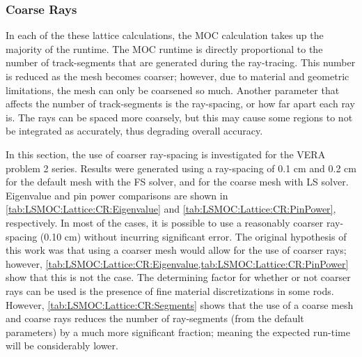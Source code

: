 {{{      \subsubsection{Coarse Rays}{\label{sssec:LSMOC:Coarse Rays}
        In each of the these lattice calculations, the \ac{MOC} calculation takes up the majority of the runtime.
        The \ac{MOC} runtime is directly proportional to the number of track-segments that are generated during the ray-tracing.
        This number is reduced as the mesh becomes coarser; however, due to material and geometric limitations, the mesh can only be coarsened so much.
        Another parameter that affects the number of track-segments is the ray-spacing, or how far apart each ray is.
        The rays can be spaced more coarsely, but this may cause some regions to not be integrated as accurately, thus degrading overall accuracy.

        In this section, the use of coarser ray-spacing is investigated for the \ac{VERA} problem 2 series.
        Results were generated using a ray-spacing of 0.1 cm and 0.2 cm for the default mesh with the \ac{FS} solver, and for the coarse mesh with \ac{LS} solver.
        Eigenvalue and pin power comparisons are shown in \cref{tab:LSMOC:Lattice:CR:Eigenvalue} and \cref{tab:LSMOC:Lattice:CR:PinPower}, respectively.
        In most of the cases, it is possible to use a reasonably coarser ray-spacing (0.10 cm) without incurring significant error.
        The original hypothesis of this work was that using a coarser mesh would allow for the use of coarser rays; however, \cref{tab:LSMOC:Lattice:CR:Eigenvalue,tab:LSMOC:Lattice:CR:PinPower} show that this is not the case.
        The determining factor for whether or not coarser rays can be used is the presence of fine material discretizations in some rods.
        However, \cref{tab:LSMOC:Lattice:CR:Segments} shows that the use of a coarse mesh and coarse rays reduces the number of ray-segments (from the default parameters) by a much more significant fraction; meaning the expected run-time will be considerably lower.

}}}}
